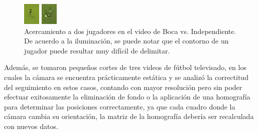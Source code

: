 \begin{figure}[H]
    \centering
    \begin{minipage}[t]{.5\textwidth}
        \centering
        \includegraphics[width=.4\linewidth]{./images/boca-dificil1.png}
    \end{minipage}%
    \begin{minipage}[t]{.5\textwidth}
        \centering
        \includegraphics[width=.4\linewidth]{./images/boca-dificil2.png}
    \end{minipage}
    \caption{Acercamiento a dos jugadores en el video de Boca vs.
             Independiente. De acuerdo a la iluminación, se puede notar que el
             contorno de un jugador puede resultar muy difícil de delimitar.
        \label{fig:boca-dificil-1}}

\end{figure}

Además, se tomaron pequeños cortes de tres videos de fútbol televisado, en los
cuales la cámara se encuentra prácticamente estática y se analizó la
correctitud del seguimiento en estos casos, contando con mayor resolución pero
sin poder efectuar exitosamente la eliminación de fondo o la aplicación de una
homografía para determinar las posiciones correctamente, ya que cada cuadro
donde la cámara cambia su orientación, la matriz de la homografía debería ser
recalculada con nuevos datos.

